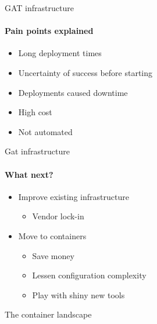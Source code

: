 \documentclass[14pt]{beamer}
\newcommand{\imageframe}[2]{{
  \usebackgroundtemplate{\texttt{[image: \#1]}}
  \begin{frame}{\vspace{-6pt}\usebeamercolor[fg]{item}\huge{#2}}
  \end{frame}
}}
\begin{document}
  \begin{frame}{GAT infrastructure}
  \framesubtitle{Pain points explained}
  \begin{itemize}
    \item Long deployment times
    \item Uncertainty of success before starting
    \item Deployments caused downtime
    \item High cost
    \item Not automated
  \end{itemize}
  \end{frame}

  \begin{frame}{Gat infrastructure}
  \framesubtitle{What next?}
  \begin{itemize}
    \item Improve existing infrastructure
    \begin{itemize}
      \item Vendor lock-in
    \end{itemize}
    \bigskip
    \item Move to containers
    \begin{itemize}
      \item Save money
      \item Lessen configuration complexity
      \item Play with shiny new tools
    \end{itemize}
  \end{itemize}
  \end{frame}


  \imageframe{images/container_landscape.jpg}{The container landscape}
\end{document}
